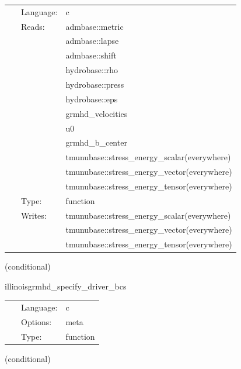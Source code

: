 \hspace{5mm}

 \begin{tabular*}{160mm}{cll} 
~ & Language:  & c \\ 
~ & Reads:  & admbase::metric \\ 
~& ~ &admbase::lapse\\ 
~& ~ &admbase::shift\\ 
~& ~ &hydrobase::rho\\ 
~& ~ &hydrobase::press\\ 
~& ~ &hydrobase::eps\\ 
~& ~ &grmhd\_velocities\\ 
~& ~ &u0\\ 
~& ~ &grmhd\_b\_center\\ 
~& ~ &tmunubase::stress\_energy\_scalar(everywhere)\\ 
~& ~ &tmunubase::stress\_energy\_vector(everywhere)\\ 
~& ~ &tmunubase::stress\_energy\_tensor(everywhere)\\ 
~ & Type:  & function \\ 
~ & Writes:  & tmunubase::stress\_energy\_scalar(everywhere) \\ 
~& ~ &tmunubase::stress\_energy\_vector(everywhere)\\ 
~& ~ &tmunubase::stress\_energy\_tensor(everywhere)\\ 
\end{tabular*} 


\vspace{5mm}

   (conditional) 

\hspace{5mm} illinoisgrmhd\_specify\_driver\_bcs 

\hspace{5mm}{\it register boundary conditions with presync } 


\hspace{5mm}

 \begin{tabular*}{160mm}{cll} 
~ & Language:  & c \\ 
~ & Options:  & meta \\ 
~ & Type:  & function \\ 
\end{tabular*} 


\vspace{5mm}

   (conditional) 

